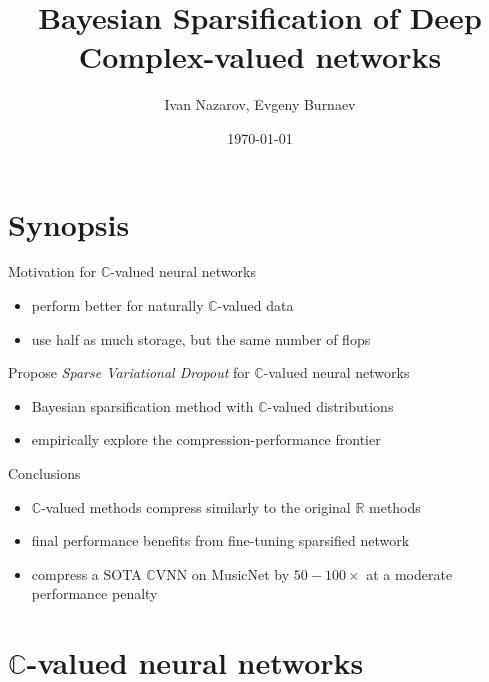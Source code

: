\documentclass{beamer}
\title[Exam]{Bayesian Sparsification of Deep Complex-valued networks}
\author[Nazarov I., Burnaev E.]{Ivan Nazarov, Evgeny Burnaev}
\date{\today}
\institute[Skoltech]{Skolkovo Institute of Science and Technology}
\newcommand{\real}{\mathbb{R}}
\newcommand{\cplx}{\mathbb{C}}
\begin{document}
\begin{frame}
  \titlepage

\end{frame}

\section{Synopsis} %
\label{sec:synopsis}

\begin{frame}[c]{\insertsection}
  Motivation for $\cplx$-valued neural networks
  \begin{itemize}
    \item perform better for naturally $\cplx$-valued data
    \item use half as much storage, but the same number of flops
  \end{itemize}

  \pause
  \medskip
  Propose \emph{Sparse Variational Dropout} for $\cplx$-valued neural networks
  \begin{itemize}
    \item Bayesian sparsification method with $\cplx$-valued distributions 
    \item empirically explore the compression-performance frontier
  \end{itemize}

  \pause
  \medskip
  Conclusions
  \begin{itemize}
    \item $\cplx$-valued methods compress similarly to the original $\real$ methods
    \item final performance benefits from fine-tuning sparsified network
    \item compress a SOTA $\cplx$VNN on MusicNet by $50-100\times$ at a moderate performance penalty
  \end{itemize}

\end{frame}


\section{$\cplx$-valued neural networks} %
\label{sec:complex_valued_networks}
\end{document}
